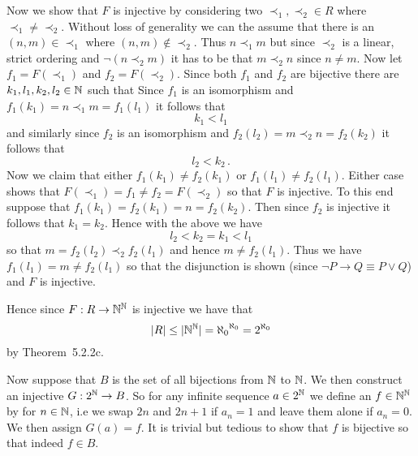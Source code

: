 {{    Now we show that $F$ is injective by considering two $\prec_1, \prec_2 \in R$ where $\prec_1 \neq \prec_2$.
    Without loss of generality we can the assume that there is an $(n,m) \in \prec_1$ where $(n,m) \notin \prec_2$.
    Thus $n \prec_1 m$ but since $\prec_2$ is a linear, strict ordering and $\lnot (n \prec_2 m)$ it has to be that $m \prec_2 n$ since $n \neq m$.
    Now let $f_1 = F(\prec_1)$ and $f_2 = F(\prec_2)$.
    Since both $f_1$ and $f_2$ are bijective there are $k_1,l_1,k_2,l_2 \in \mathbb{N}$ such that
    Since $f_1$ is an isomorphism and $f_1(k_1) = n \prec_1 m = f_1(l_1)$ it follows that
    $$
    k_1 < l_1
    $$
    and similarly since $f_2$ is an isomorphism and $f_2(l_2) = m \prec_2 n = f_2(k_2)$ it follows that
    $$
    l_2 < k_2 \,.
    $$
    Now we claim that either $f_1(k_1) \neq f_2(k_1)$ or $f_1(l_1) \neq f_2(l_1)$.
    Either case shows that $F(\prec_1) = f_1 \neq f_2 = F(\prec_2)$ so that $F$ is injective.
    To this end suppose that $f_1(k_1) = f_2(k_1) = n = f_2(k_2)$.
    Then since $f_2$ is injective it follows that $k_1 = k_2$.
    Hence with the above we have
    $$
    l_2 < k_2 = k_1 < l_1
    $$
    so that $m = f_2(l_2) \prec_2 f_2(l_1)$ and hence $m \neq f_2(l_1)$.
    Thus we have $f_1(l_1) = m \neq f_2(l_1)$ so that the disjunction is shown (since $\lnot P \to Q \equiv P \lor Q$) and $F$ is injective.

    Hence since $F: R \to \mathbb{N}^{\mathbb{N}}$ is injective we have that
    $$
    |R| \leq |\mathbb{N}^{\mathbb{N}}| = {\aleph_0}^{\aleph_0} = {2^{\aleph_0}}
    $$
    by Theorem~5.2.2c.

    Now suppose that $B$ is the set of all bijections from $\mathbb{N}$ to $\mathbb{N}$.
    We then construct an injective $G: 2^{\mathbb{N}} \to B$.
    So for any infinite sequence $a \in 2^{\mathbb{N}}$ we define an $f \in \mathbb{N}^{\mathbb{N}}$ by
    for $n \in \mathbb{N}$, i.e we swap $2n$ and $2n+1$ if $a_n = 1$ and leave them alone if $a_n = 0$.
    We then assign $G(a) = f$.
    It is trivial but tedious to show that $f$ is bijective so that indeed $f \in B$.

}}

